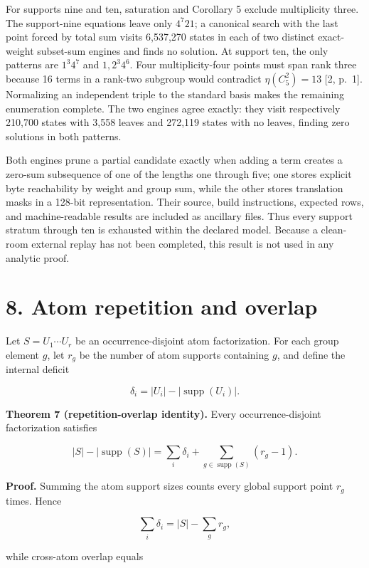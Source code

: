 \documentclass[
  11pt,
]{article}
\begin{document}
For supports nine and ten, saturation and Corollary 5 exclude
multiplicity three. The support-nine equations leave only \(4^7 2 1\); a
canonical search with the last point forced by total sum visits
6,537,270 states in each of two distinct exact-weight subset-sum engines
and finds no solution. At support ten, the only patterns are \(1^3 4^7\)
and \(1,2^3 4^6\). Four multiplicity-four points must span rank three
because 16 terms in a rank-two subgroup would contradict
\(\eta(C_5^2)=13\) {[}2, p.~1{]}. Normalizing an independent triple to
the standard basis makes the remaining enumeration complete. The two
engines agree exactly: they visit respectively 210,700 states with 3,558
leaves and 272,119 states with no leaves, finding zero solutions in both
patterns.

Both engines prune a partial candidate exactly when adding a term
creates a zero-sum subsequence of one of the lengths one through five;
one stores explicit byte reachability by weight and group sum, while the
other stores translation masks in a 128-bit representation. Their
source, build instructions, expected rows, and machine-readable results
are included as ancillary files. Thus every support stratum through ten
is exhausted within the declared model. Because a clean-room external
replay has not been completed, this result is not used in any analytic
proof.

\hypertarget{atom-repetition-and-overlap}{%
\section{8. Atom repetition and
overlap}\label{atom-repetition-and-overlap}}

Let \(S=U_1\cdots U_r\) be an occurrence-disjoint atom factorization.
For each group element \(g\), let \(r_g\) be the number of atom supports
containing \(g\), and define the internal deficit

\[
\delta_i=|U_i|-|\operatorname{supp}(U_i)|.
\]

\textbf{Theorem 7 (repetition-overlap identity).} Every
occurrence-disjoint factorization satisfies

\[
|S|-|\operatorname{supp}(S)|
=\sum_i\delta_i
+\sum_{g\in\operatorname{supp}(S)}(r_g-1).
\]

\textbf{Proof.} Summing the atom support sizes counts every global
support point \(r_g\) times. Hence

\[
\sum_i\delta_i=|S|-\sum_g r_g,
\]

while cross-atom overlap equals
\end{document}
